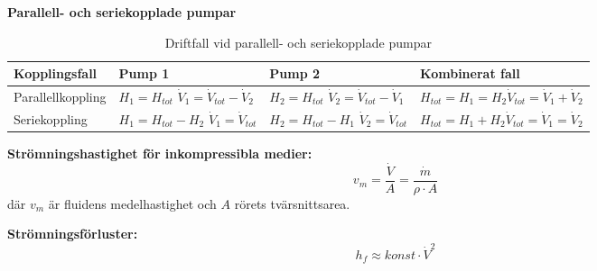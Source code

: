 	\textbf{Parallell- och seriekopplade pumpar} 
	\begin{table}[h]
    \caption{Driftfall vid parallell- och seriekopplade pumpar}
    \centering
    \begin{tabularx}{\linewidth}{X p{3cm} p{3cm} p{3cm}}
        \hline
        Kopplingsfall & Pump 1 & Pump 2 & Kombinerat fall \\
        \hline
        Parallellkoppling 
        							& $H_1 = H_{tot}$ \newline $\dot{V}_1=\dot{V}_{tot} - \dot{V}_{2}$  
        							& $H_2 = H_{tot}$ \newline $\dot{V}_2=\dot{V}_{tot} - \dot{V}_{1}$
        							& $H_{tot}=H_1 = H_2$\newline $\dot{V}_{tot}=\dot{V}_{1}+\dot{V}_{2}$\\
        Seriekoppling 
        							& $H_1=H_{tot} - H_{2}$ \newline $\dot{V}_1 = \dot{V}_{tot}$ 
        							& $H_2=H_{tot} - H_{1}$ \newline $\dot{V}_2 = \dot{V}_{tot}$ 
        							& $H_{tot}=H_1 + H_2$\newline $\dot{V}_{tot}=\dot{V}_{1}=\dot{V}_{2}$\\
        \hline
    \end{tabularx}
\end{table}
\par
\begin{minipage}{\textwidth}
	\textbf{Strömningshastighet för inkompressibla medier: } 
	\begin{equation*}
    v_m = \dfrac{\dot{V}}{A} =  \dfrac{\dot{m}}{\rho \cdot A}
	\end{equation*}
		där $v_m$ är fluidens medelhastighet och $A$ rörets tvärsnittsarea.\par 
\end{minipage}
\par
	\textbf{Strömningsförluster: } 
	\begin{equation*}
		h_f \approx konst \cdot \dot{V}^2
	\end{equation*}

